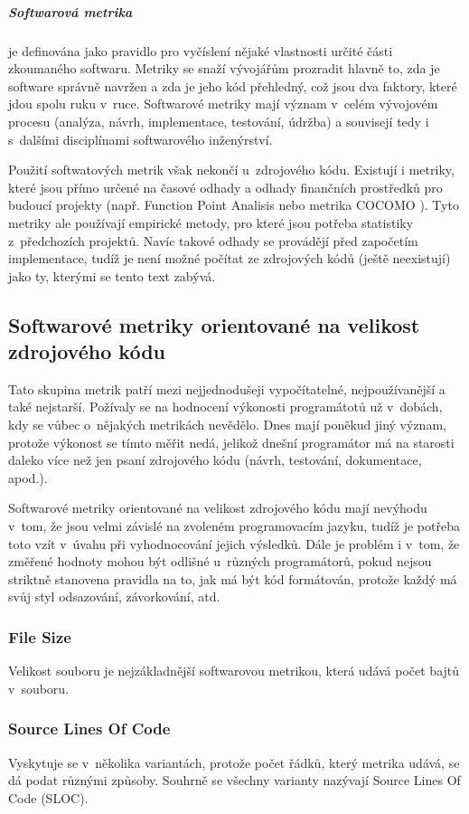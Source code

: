 \documentclass[11pt,twoside,a4paper]{book}
\begin{document}
\subparagraph{Softwarová metrika} je definována\cite{SciTech04} jako pravidlo pro vyčíslení nějaké vlastnosti určité části zkoumaného softwaru.
Metriky se snaží vývojářům prozradit hlavně to, zda je software správně navržen a zda je jeho kód přehledný, což jsou dva
faktory, které jdou spolu ruku v~ruce. Softwarové metriky mají význam v~celém vývojovém procesu (analýza, návrh, implementace,
testování, údržba) a souvisejí tedy i s~dalšími disciplínami softwarového inženýrství.

Použití softwatových metrik však nekončí u~zdrojového kódu. Existují i metriky, které jsou přímo určené na
časové odhady a odhady finančních prostředků pro budoucí projekty (např. Function Point Analisis \cite{FPA} nebo metrika COCOMO \cite{COCOMO}).
Tyto metriky ale používají empirické metody, pro které jsou potřeba statistiky z~předchozích projektů. Navíc takové
odhady se provádějí před započetím implementace, tudíž je není možné počítat ze zdrojových kódů (ještě neexistují)
jako ty, kterými se tento text zabývá.

\subsection{Softwarové metriky orientované na velikost zdrojového kódu}
Tato skupina metrik patří mezi nejjednodušeji vypočítatelné, nejpoužívanější a také nejstarší.
Požívaly se na hodnocení výkonosti programátotů už v~dobách, kdy se vůbec o~nějakých  metrikách nevědělo.
Dnes mají poněkud jiný význam, protože výkonost se tímto měřit nedá, jelikož dnešní programátor má na starosti
daleko více než jen psaní zdrojového kódu (návrh, testování, dokumentace, apod.).

Softwarové metriky orientované na velikost zdrojového kódu mají nevýhodu v~tom, že jsou velmi závislé na zvoleném
programovacím jazyku, tudíž je potřeba toto vzít v~úvahu při vyhodnocování jejich výsledků. Dále je problém i v~tom,
že změřené hodnoty mohou být odlišné u~různých programátorů, pokud nejsou striktně stanovena pravidla na to,
jak má být kód formátován, protože každý má svůj styl odsazování, závorkování, atd.

\subsubsection{File Size}
Velikost souboru je nejzákladnější softwarovou metrikou, která udává počet bajtů v~souboru.

\subsubsection{Source Lines Of Code}
Vyskytuje se v~několika variantách, protože počet řádků, který metrika udává, se dá podat různými způsoby.
Souhrně se všechny varianty nazývají Source Lines Of Code (SLOC).
\end{document}
